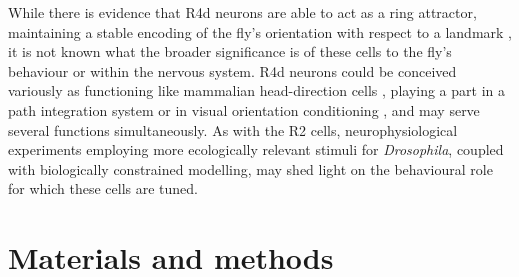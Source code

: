 \begin{comment}
[How the visual information provided by these cells might be integrated in the general sensorimotor architecture of the central complex is still an open question. It might be PI or operant association of action + stimuli.

Condense: \\
R4d neurons could form part of a ‘path integration’ system \cite{Neuser2008} or be analogous to mammalian head-direction cells \cite{Tomchik2008}. Indeed, there is evidence that, as with path integration and head direction cells, these cells also integrate idiothetic information \cite{Zars2009}. This raises the intriguing possibility that ring neurons play a role in a short-term memory system in order to facilitate complex behavioural responses which require integration of multiple sources of information over time, rather than simpler reflexive or classically conditioned behaviours. The fly could be remembering the position of a stimulus, the history of its own movements, or both \cite{Tomchik2008}. Work by Guo \emph{et al.} \cite{Guo2015} indicates that R3/R4d neurons, but not R2/R4m, play a role in learned spatial orientation to stimuli other than simple vertical bars. Flies tethered in a drum were conditioned to fly toward either the left or right of a visual pattern (such as an inverted ‘T’); it was found that the absence of these neurons prevented conditioning. This suggests a role for R4d cells in remembering the position of a stimulus with respect to the fly’s own movements, as would be required in a path integration system.]
\end{comment}

While there is evidence that R4d neurons are able to act as a ring attractor, maintaining a stable encoding of the fly's orientation with respect to a landmark \cite{Seelig2015}, it is not known what the broader significance is of these cells to the fly's behaviour or within the nervous system.
R4d neurons could be conceived variously as functioning like mammalian head-direction cells \cite{Tomchik2008}, playing a part in a path integration system \cite{Neuser2008} or in visual orientation conditioning \cite{Guo2015}, and may serve several functions simultaneously.
As with the R2 cells, neurophysiological experiments employing more ecologically relevant stimuli for \emph{Drosophila}, coupled with biologically constrained modelling, may shed light on the behavioural role for which these cells are tuned.

\section*{Materials and methods}
